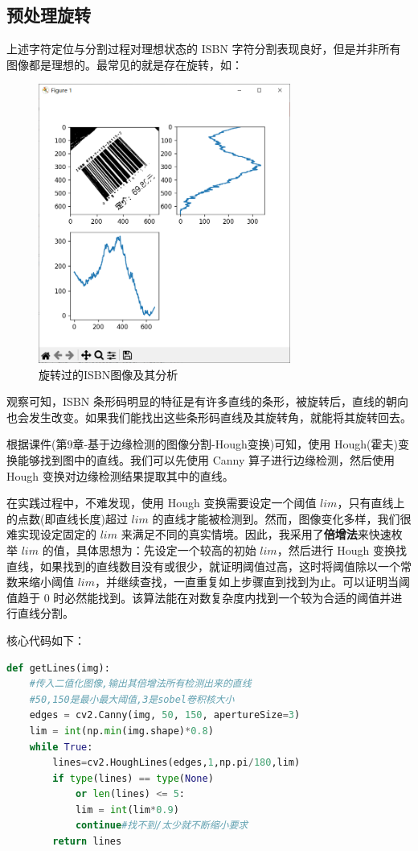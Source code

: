 \documentclass{ctexart}
\begin{document}
\subsection{预处理旋转}
上述字符定位与分割过程对理想状态的 ISBN 字符分割表现良好，但是并非所有图像都是理想的。最常见的就是存在旋转，如：

\begin{figure}[H]
    \centering
    \includegraphics[height=260pt]{isbn_rotated}
    \caption{旋转过的ISBN图像及其分析}
\end{figure}

观察可知，ISBN 条形码明显的特征是有许多直线的条形，被旋转后，直线的朝向也会发生改变。如果我们能找出这些条形码直线及其旋转角，就能将其旋转回去。

根据课件(第9章-基于边缘检测的图像分割-Hough变换)可知，使用 Hough(霍夫)变换能够找到图中的直线。我们可以先使用 Canny 算子进行边缘检测，然后使用 Hough 变换对边缘检测结果提取其中的直线。

在实践过程中，不难发现，使用 Hough 变换需要设定一个阈值 $lim$，只有直线上的点数(即直线长度)超过 $lim$ 的直线才能被检测到。然而，图像变化多样，我们很难实现设定固定的 $lim$ 来满足不同的真实情境。因此，我采用了\textbf{倍增法}来快速枚举 $lim$ 的值，具体思想为：先设定一个较高的初始 $lim$，然后进行 Hough 变换找直线，如果找到的直线数目没有或很少，就证明阈值过高，这时将阈值除以一个常数来缩小阈值 $lim$，并继续查找，一直重复如上步骤直到找到为止。可以证明当阈值趋于 $0$ 时必然能找到。该算法能在对数复杂度内找到一个较为合适的阈值并进行直线分割。

核心代码如下：

\begin{lstlisting}[language=python]
def getLines(img):
    #传入二值化图像,输出其倍增法所有检测出来的直线
    #50,150是最小最大阈值,3是sobel卷积核大小
    edges = cv2.Canny(img, 50, 150, apertureSize=3)
    lim = int(np.min(img.shape)*0.8)
    while True:
        lines=cv2.HoughLines(edges,1,np.pi/180,lim)
        if type(lines) == type(None) 
            or len(lines) <= 5:
            lim = int(lim*0.9)
            continue#找不到/太少就不断缩小要求
        return lines
\end{lstlisting}
\end{document}
